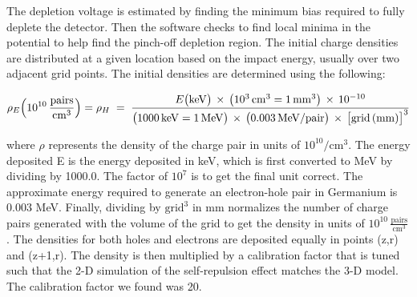 The depletion voltage is estimated by finding the minimum bias required to fully deplete the detector. Then the software checks to find local minima in the potential to help find the pinch-off depletion region. The initial charge densities are distributed at a given location based on the impact energy, usually over two adjacent grid points. The initial densities are determined using the following:


\begin{equation}
\rho_E \Bigl(10^{10} \,\frac{\mathrm{pairs}}{\mathrm{cm^3}}\Bigr) = \rho_H  \;=\;
\frac{ E\bigl(\mathrm{keV}\bigr)\,\times\,\bigl(10^{3}\,\mathrm{cm}^{3} = 1\,\mathrm{mm}^3\bigr)\,\times\,10^{-10} }{ \bigl(1000\,\mathrm{keV} = 1\,\mathrm{MeV}\bigr) \,\times\,\bigl(0.003\,\mathrm{MeV/pair}\bigr)\,\times\,\bigl[\text{grid}\,(\mathrm{mm})\bigr]^3 }
\label{eq:density_with_units}
\end{equation}



where $\rho$ represents the density of the charge pair in units of \(10^{10}/\text{cm}^3\). The energy deposited E is the energy deposited in keV, which is first converted to MeV by dividing by 1000.0. The factor of \(10^7\) is to get the final unit correct. The approximate energy required to generate an electron-hole pair in Germanium is $0.003$ MeV. Finally, dividing by \(\text{grid}^3\) in mm normalizes the number of charge pairs generated with the volume of the grid to get the density in units of $10^{10} \,\frac{\mathrm{pairs}}{\mathrm{cm^3}}$. The densities for both holes and electrons are deposited equally in points (z,r) and (z+1,r). The density is then multiplied by a calibration factor that is tuned such that the 2-D simulation of the self-repulsion effect matches the 3-D model. The calibration factor we found was 20.

